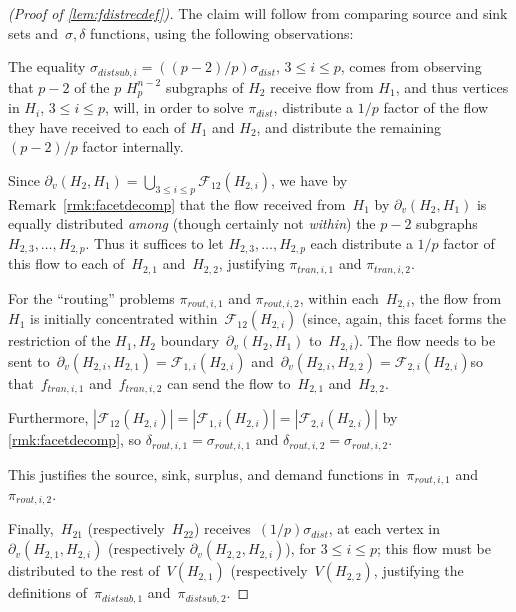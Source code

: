 \documentclass[
final
]{dmtcs-episciences}
\newcommand{\bdryh}[2]{\partial_v(#1,#2)}
\newcommand{\faceth}[1]{\mathcal{F}_{#1}}
\begin{document}
\begin{proof}[(Proof of \cref{lem:fdistrecdef})]
   The claim will follow from comparing source and sink sets and~$\sigma, \delta$ functions, using the following observations:
   
   The equality $\sigma_{distsub,i} = ((p-2)/p)\sigma_{dist}$, $3 \leq i \leq p$, comes from observing that $p-2$ of the $p$ $H_p^{n-2}$ subgraphs of $H_2$ receive flow from $H_1$, and thus vertices in $H_i$, $3 \leq i \leq p$, will, in order to solve $\pi_{dist}$, distribute a $1/p$ factor of the flow they have received to each of $H_1$ and $H_2$, and distribute the remaining $(p-2)/p$ factor internally.

    Since $\bdryh{H_2}{H_1} = \bigcup_{3 \leq i \leq p} \faceth{12}(H_{2,i})$, we have by Remark~\ref{rmk:facetdecomp} that the flow received from~$H_1$ by $\bdryh{H_2}{H_1}$ is equally distributed \emph{among} (though certainly not \emph{within}) the $p - 2$ subgraphs $H_{2,3}, \dots, H_{2,p}$. Thus it suffices to let $H_{2,3}, \dots, H_{2,p}$ each distribute a $1/p$ factor of this flow to each of~$H_{2,1}$ and~$H_{2,2}$, justifying $\pi_{tran,i,1}$ and $\pi_{tran,i,2}$.

    For the ``routing'' problems $\pi_{rout,i,1}$ and $\pi_{rout,i,2}$, within each~$H_{2,i}$, the flow from~$H_1$ is initially concentrated within~$\faceth{12}(H_{2,i})$ (since, again, this facet forms the restriction of the $H_1, H_2$ boundary~$\bdryh{H_2}{H_1}$ to~$H_{2,i}$). The flow needs to be sent to~$\bdryh{H_{2,i}}{H_{2,1}} = \faceth{1,i}(H_{2,i})$ and~$\bdryh{H_{2,i}}{H_{2,2}} = \faceth{2,i}(H_{2,i})$\textemdash so that~$f_{tran,i,1}$ and~$f_{tran,i,2}$ can send the flow to~$H_{2,1}$ and~$H_{2,2}$.

    Furthermore, $|\faceth{12}(H_{2,i})| = |\faceth{1,i}(H_{2,i})| = |\faceth{2,i}(H_{2,i})|$ by \cref{rmk:facetdecomp}, so $\delta_{rout,i,1} = \sigma_{rout,i,1}$ and $\delta_{rout,i,2} = \sigma_{rout,i,2}$. 

    This justifies the source, sink, surplus, and demand functions in~$\pi_{rout,i,1}$ and~$\pi_{rout,i,2}$.

    Finally,~$H_{21}$ (respectively~$H_{22}$) receives~$(1/p)\sigma_{dist}$, at each vertex in~$\bdryh{H_{2,1}}{H_{2,i}}$ (respectively $\bdryh{H_{2,2}}{H_{2,i}}$), for $3 \leq i \leq p$; this flow must be distributed to the rest of~$V(H_{2,1})$ (respectively~$V(H_{2,2})$, justifying the definitions of~$\pi_{distsub,1}$ and~$\pi_{distsub,2}$.
\end{proof}
\end{document}
